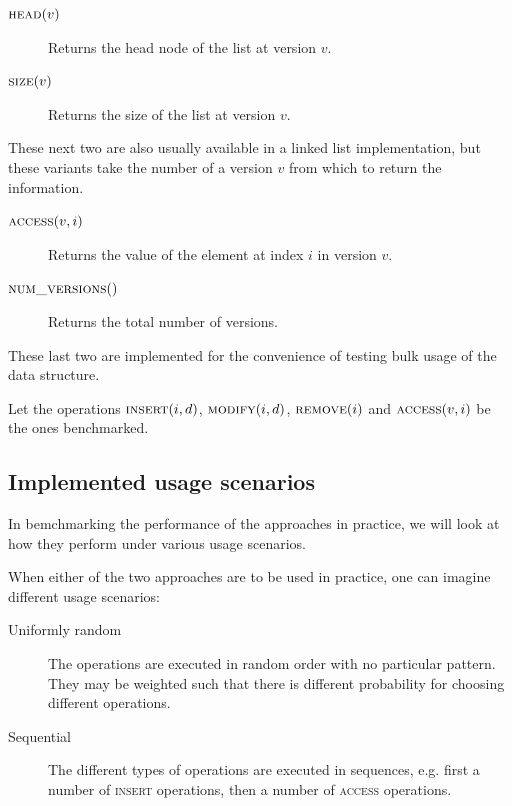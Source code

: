 \begin{description}

  \item[$\textsc{head}(v)$] Returns the head node of the list at version
  $v$.

  \item[$\textsc{size}(v)$] Returns the size of the list at version $v$.

\end{description}

These next two are also usually available in a linked list implementation, but
these variants take the number of a version $v$ from which to return the
information.

\begin{description}

  \item[$\textsc{access}(v,i)$] Returns the value of the element at index $i$ in
  version $v$.

  \item[$\textsc{num\_versions}()$] Returns the total number of versions.

\end{description}

These last two are implemented for the convenience of testing bulk usage of the
data structure.

Let the operations $\textsc{insert}(i,d)$, $\textsc{modify}(i,d)$,
$\textsc{remove}(i)$ and $\textsc{access}(v,i)$ be the ones benchmarked.

\subsection{Implemented usage scenarios}

In bemchmarking the performance of the approaches in practice, we will look at
how they perform under various usage scenarios.

When either of the two approaches are to be used in practice, one can imagine
different usage scenarios:

\begin{description}

  \item[Uniformly random] The operations are executed in random order with no
  particular pattern. They may be weighted such that there is different
  probability for choosing different operations.

  \item[Sequential] The different types of operations are executed in sequences,
  e.g. first a number of \textsc{insert} operations, then a number of
  \textsc{access} operations.


\end{description}


